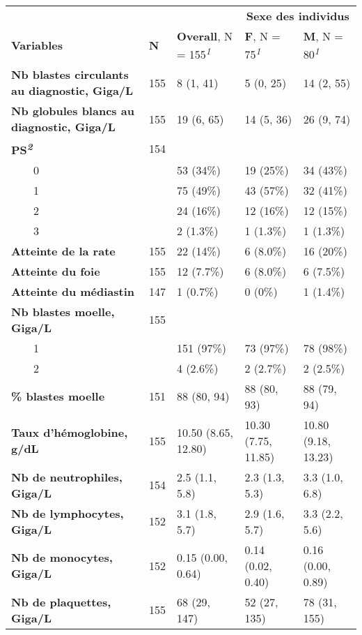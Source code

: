 \setlength{\LTpost}{0mm}
\begin{longtable}{|p{8cm}|p{0.5cm}|p{2.5cm}|p{2cm}|p{2cm}|} %
\toprule
 &  &  & \multicolumn{2}{c}{\textbf{Sexe des individus}} \\ 
\cmidrule(lr){4-5}
\textbf{Variables} & \textbf{N} & \textbf{Overall}, N = 155\textsuperscript{\textit{1}} & \textbf{F}, N = 75\textsuperscript{\textit{1}} & \textbf{M}, N = 80\textsuperscript{\textit{1}} \\ 
\midrule\addlinespace[2.5pt]
\textbf{Nb blastes circulants au diagnostic, Giga/L} & 155 & 8 (1, 41) & 5 (0, 25) & 14 (2, 55) \\ 
\textbf{Nb globules blancs au diagnostic, Giga/L} & 155 & 19 (6, 65) & 14 (5, 36) & 26 (9, 74) \\ 
\textbf{PS\textsuperscript{\textit{2}}} & 154 &  &  &  \\ 
    0 &  & 53 (34\%) & 19 (25\%) & 34 (43\%) \\ 
    1 &  & 75 (49\%) & 43 (57\%) & 32 (41\%) \\ 
    2 &  & 24 (16\%) & 12 (16\%) & 12 (15\%) \\ 
    3 &  & 2 (1.3\%) & 1 (1.3\%) & 1 (1.3\%) \\ 
\textbf{Atteinte de la rate} & 155 & 22 (14\%) & 6 (8.0\%) & 16 (20\%) \\ 
\textbf{Atteinte du foie} & 155 & 12 (7.7\%) & 6 (8.0\%) & 6 (7.5\%) \\ 
\textbf{Atteinte du médiastin} & 147 & 1 (0.7\%) & 0 (0\%) & 1 (1.4\%) \\ 
\textbf{Nb blastes moelle, Giga/L} & 155 &  &  &  \\ 
    1 &  & 151 (97\%) & 73 (97\%) & 78 (98\%) \\ 
    2 &  & 4 (2.6\%) & 2 (2.7\%) & 2 (2.5\%) \\ 
\textbf{\% blastes moelle} & 151 & 88 (80, 94) & 88 (80, 93) & 88 (79, 94) \\ 
\textbf{Taux d'hémoglobine, g/dL} & 155 & 10.50 (8.65, 12.80) & 10.30 (7.75, 11.85) & 10.80 (9.18, 13.23) \\ 
\textbf{Nb de neutrophiles, Giga/L} & 154 & 2.5 (1.1, 5.8) & 2.3 (1.3, 5.3) & 3.3 (1.0, 6.8) \\ 
\textbf{Nb de lymphocytes, Giga/L} & 152 & 3.1 (1.8, 5.7) & 2.9 (1.6, 5.7) & 3.3 (2.2, 5.6) \\ 
\textbf{Nb de monocytes, Giga/L} & 152 & 0.15 (0.00, 0.64) & 0.14 (0.02, 0.40) & 0.16 (0.00, 0.89) \\ 
\textbf{Nb de plaquettes, Giga/L} & 155 & 68 (29, 147) & 52 (27, 135) & 78 (31, 155) \\ 
\bottomrule
\end{longtable}
